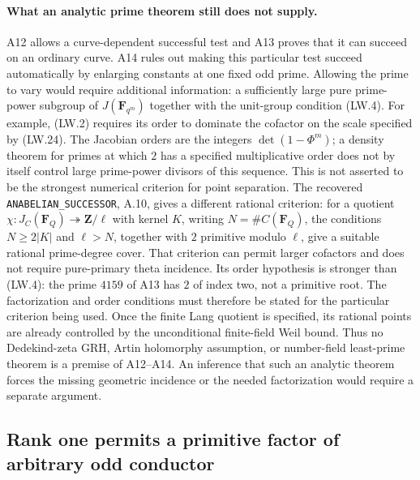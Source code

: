 \documentclass[11pt,a4paper]{article}
\begin{document}
\paragraph{What an analytic prime theorem still does not supply.}
A12 allows a curve-dependent successful test and A13 proves that
it can succeed on an ordinary curve.  A14 rules out making this
particular test succeed automatically by enlarging constants at one
fixed odd prime.  Allowing the prime to vary would require additional
information: a sufficiently large pure prime-power subgroup of
$J(\mathbf F_{q^m})$ together with the unit-group condition (LW.4).
For example, (LW.2) requires its order to dominate the cofactor on
the scale specified by (LW.24).
The Jacobian orders are the integers
$\det(1-\Phi^m)$; a density theorem for primes at which $2$ has a
specified multiplicative order does not by itself control large
prime-power divisors of this sequence.
This is not asserted to be the strongest numerical criterion for
point separation.  The recovered \texttt{ANABELIAN\_SUCCESSOR},
A.10, gives a different rational criterion: for a quotient
$\chi:J_C(\mathbf F_Q)\twoheadrightarrow\mathbf Z/\ell$ with
kernel $K$, writing $N=\#C(\mathbf F_Q)$, the conditions
$N\ge2|K|$ and $\ell>N$, together with $2$ primitive modulo $\ell$,
give a suitable rational prime-degree cover.  That criterion can
permit larger cofactors and does not require pure-primary theta
incidence.  Its order hypothesis is stronger than (LW.4):
the prime $4159$ of A13 has $2$ of index two, not a primitive root.
The factorization and order conditions must therefore be stated
for the particular criterion being used.
Once the finite Lang quotient is specified, its rational points
are already controlled by the unconditional finite-field Weil bound.
Thus no Dedekind-zeta GRH, Artin holomorphy assumption, or
number-field least-prime theorem is a premise of A12--A14.
An inference that such an analytic theorem forces the missing
geometric incidence or the needed factorization would require a
separate argument.


\subsection{Rank one permits a primitive factor of arbitrary odd conductor}
\label{sec:rank-one-composite-bridge}
\end{document}

